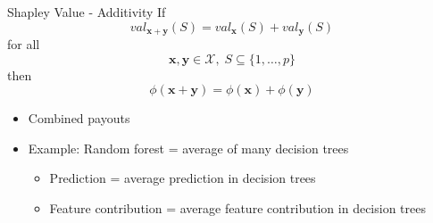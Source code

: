 \begin{frame}{Shapley Value - Additivity}
	If
	\begin{equation}
		val_{\bm{x} + \bm{y}}(S)=val_{\bm{x}}(S) + val_{\bm{y}}(S)
	\end{equation}
	for all
	\begin{equation*}
		\bm{x}, \bm{y} \in \mathcal{X},\; S\subseteq\{1,\ldots, p\}
	\end{equation*}
	then
	\begin{equation*}
		\phi(\bm{x} + \bm{y})=\phi(\bm{x}) + \phi(\bm{y})
	\end{equation*}
	\begin{itemize}
		\item Combined payouts
		\item Example: Random forest = average of many decision trees
		\begin{itemize}
			\item Prediction = average prediction in decision trees
			\item Feature contribution = average feature contribution in decision trees
		\end{itemize}
	\end{itemize}
\end{frame}